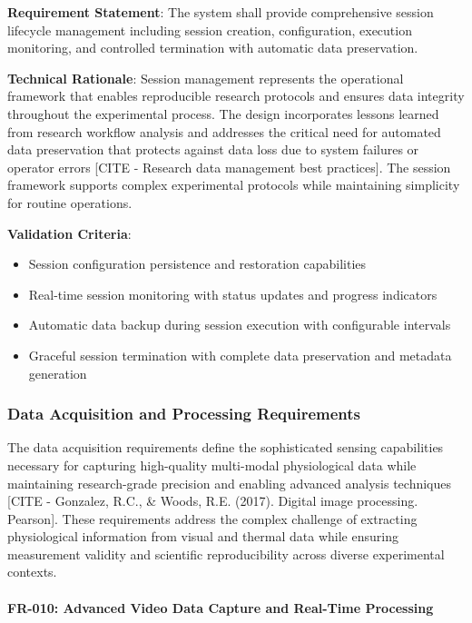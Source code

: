 \documentclass[11pt,a4paper]{report}
\begin{document}
\textbf{Requirement Statement}: The system shall provide comprehensive session lifecycle management including session
creation, configuration, execution monitoring, and controlled termination with automatic data preservation.

\textbf{Technical Rationale}: Session management represents the operational framework that enables reproducible research
protocols and ensures data integrity throughout the experimental process. The design incorporates lessons learned from
research workflow analysis and addresses the critical need for automated data preservation that protects against data
loss due to system failures or operator errors [CITE - Research data management best practices]. The session framework
supports complex experimental protocols while maintaining simplicity for routine operations.

\textbf{Validation Criteria}:

\begin{itemize}
\item Session configuration persistence and restoration capabilities
\item Real-time session monitoring with status updates and progress indicators
\item Automatic data backup during session execution with configurable intervals
\item Graceful session termination with complete data preservation and metadata generation

\end{itemize}
\subsubsection{Data Acquisition and Processing Requirements}

The data acquisition requirements define the sophisticated sensing capabilities necessary for capturing high-quality
multi-modal physiological data while maintaining research-grade precision and enabling advanced analysis
techniques [CITE - Gonzalez, R.C., \& Woods, R.E. (2017). Digital image processing. Pearson]. These requirements address
the complex challenge of extracting physiological information from visual and thermal data while ensuring measurement
validity and scientific reproducibility across diverse experimental contexts.

\paragraph{FR-010: Advanced Video Data Capture and Real-Time Processing}
\end{document}
